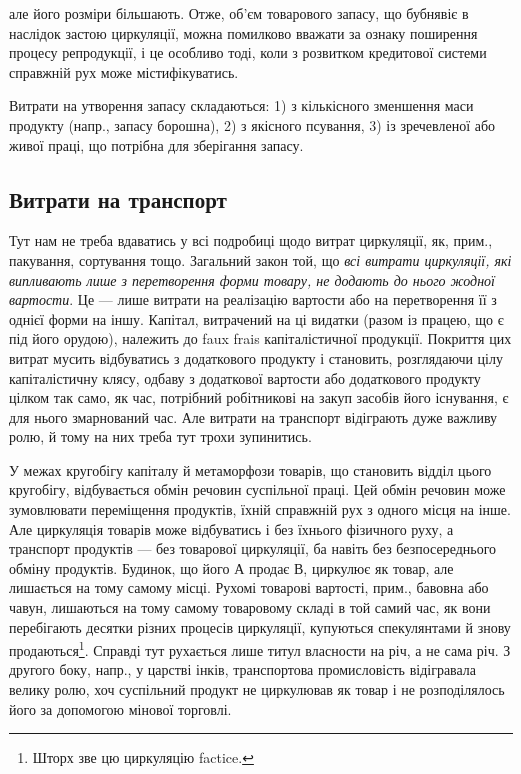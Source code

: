 \parcont{}  %
але його розміри більшають. Отже, об’єм товарового запасу, що
бубнявіє в наслідок застою циркуляції, можна помилково вважати за
ознаку поширення процесу репродукції, і це особливо тоді, коли з розвитком
кредитової системи справжній рух може містифікуватись.

Витрати на утворення запасу складаються: 1) з кількісного зменшення
маси продукту (напр., запасу борошна), 2) з якісного псування, 3) із зречевленої
або живої праці, що потрібна для зберігання запасу.

\subsection{Витрати на транспорт}

Тут нам не треба вдаватись у всі подробиці щодо витрат циркуляції,
як, прим., пакування, сортування тощо. Загальний закон той, що \emph{всі
витрати циркуляції, які випливають лише з перетворення
форми товару, не додають до нього жодної
вартости}. Це — лише витрати на реалізацію вартости або на перетворення
її з однієї форми на іншу. Капітал, витрачений на ці видатки
(разом із працею, що є під його орудою), належить до faux frais капіталістичної
продукції. Покриття цих витрат мусить відбуватись з додаткового
продукту і становить, розглядаючи цілу капіталістичну клясу, одбаву
з додаткової вартости або додаткового продукту цілком так само,
як час, потрібний робітникові на закуп засобів його існування, є для нього
змарнований час. Але витрати на транспорт відіграють дуже важливу
ролю, й тому на них треба тут трохи зупинитись.

У межах кругобігу капіталу й метаморфози товарів, що становить
відділ цього кругобігу, відбувається обмін речовин суспільної праці. Цей
обмін речовин може зумовлювати переміщення продуктів, їхній справжній
рух з одного місця на інше. Але циркуляція товарів може відбуватись і
без їхнього фізичного руху, а транспорт продуктів — без товарової циркуляції,
ба навіть без безпосереднього обміну продуктів. Будинок, що
його А продає В, циркулює як товар, але лишається на тому самому
місці. Рухомі товарові вартості, прим., бавовна або чавун, лишаються
на тому самому товаровому складі в той самий час, як вони перебігають
десятки різних процесів циркуляції, купуються спекулянтами й знову
продаються\footnote{
Шторх зве цю циркуляцію factice.
}. Справді тут рухається лише титул власности на річ, а не
сама річ. З другого боку, напр., у царстві інків, транспортова промисловість
відігравала велику ролю, хоч суспільний продукт не циркулював як
товар і не розподілялось його за допомогою мінової торговлі.

